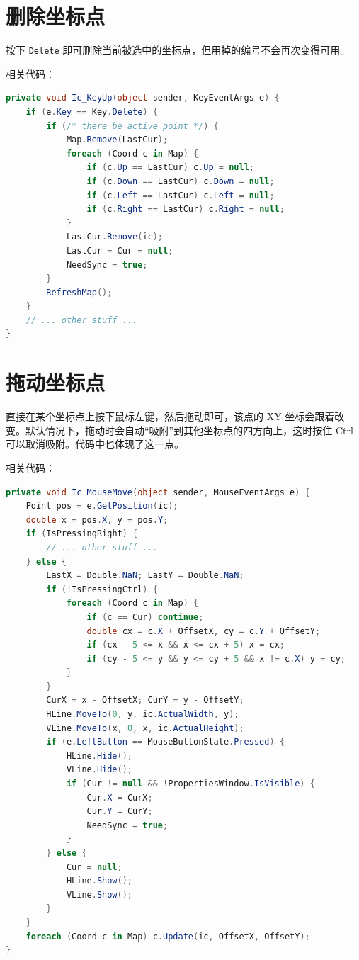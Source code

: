 \section{删除坐标点}

按下 \texttt{Delete} 即可删除当前被选中的坐标点，但用掉的编号不会再次变得可用。

相关代码：

\begin{lstlisting}[language=cs]
private void Ic_KeyUp(object sender, KeyEventArgs e) {
    if (e.Key == Key.Delete) {
        if (/* there be active point */) {
            Map.Remove(LastCur);
            foreach (Coord c in Map) {
                if (c.Up == LastCur) c.Up = null;
                if (c.Down == LastCur) c.Down = null;
                if (c.Left == LastCur) c.Left = null;
                if (c.Right == LastCur) c.Right = null;
            }
            LastCur.Remove(ic);
            LastCur = Cur = null;
            NeedSync = true;
        }
        RefreshMap();
    }
    // ... other stuff ...
}
\end{lstlisting}

\section{拖动坐标点}

直接在某个坐标点上按下鼠标左键，然后拖动即可，该点的 XY 坐标会跟着改变。默认情况下，拖动时会自动``吸附''到其他坐标点的四方向上，这时按住 Ctrl 可以取消吸附。代码中也体现了这一点。

相关代码：

\begin{lstlisting}[language=cs]
private void Ic_MouseMove(object sender, MouseEventArgs e) {
    Point pos = e.GetPosition(ic);
    double x = pos.X, y = pos.Y;
    if (IsPressingRight) {
        // ... other stuff ...
    } else {
        LastX = Double.NaN; LastY = Double.NaN;
        if (!IsPressingCtrl) {
            foreach (Coord c in Map) {
                if (c == Cur) continue;
                double cx = c.X + OffsetX, cy = c.Y + OffsetY;
                if (cx - 5 <= x && x <= cx + 5) x = cx;
                if (cy - 5 <= y && y <= cy + 5 && x != c.X) y = cy;
            }
        }
        CurX = x - OffsetX; CurY = y - OffsetY;
        HLine.MoveTo(0, y, ic.ActualWidth, y);
        VLine.MoveTo(x, 0, x, ic.ActualHeight);
        if (e.LeftButton == MouseButtonState.Pressed) {
            HLine.Hide();
            VLine.Hide();
            if (Cur != null && !PropertiesWindow.IsVisible) {
                Cur.X = CurX;
                Cur.Y = CurY;
                NeedSync = true;
            }
        } else {
            Cur = null;
            HLine.Show();
            VLine.Show();
        }
    }
    foreach (Coord c in Map) c.Update(ic, OffsetX, OffsetY);
}
\end{lstlisting}

